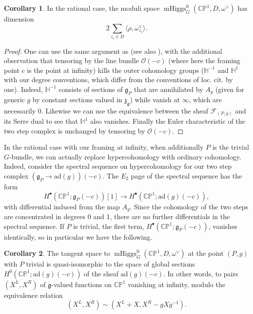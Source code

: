\documentclass[11pt, oneside, reqno]{amsart}
\theoremstyle{definition} \newtheorem{definition}{Definition}[section]
\newtheorem{corollary}[definition]{Corollary}
\theoremstyle{definition} \newtheorem{remark}[definition]{Remark}
\theoremstyle{definition} \newtheorem{remarks}[definition]{Remarks}
\theoremstyle{definition} \newtheorem{question}[definition]{Question}
\theoremstyle{definition} \newtheorem*{note}{Note}
\theoremstyle{definition} \newtheorem{example}[definition]{Example}
\theoremstyle{definition} \newtheorem{examples}[definition]{Examples}
\renewcommand{\gg}{\mathfrak{g}}
\newcommand{\bb}[1]{\mathbb{#1}}
\newcommand{\mr}[1]{\mathrm{#1}}
\newcommand{\mc}[1]{\mathcal{#1}}
\newcommand{\mf}[1]{\mathfrak{#1}}
\newcommand{\OO}{\mathcal{O}}
\DeclareMathOperator{\mhiggs}{mHiggs}
\newcommand{\fr}{\mathrm{fr}}
\newcommand{\ad}{\mr{ad}}
\begin{document}
\begin{corollary} \label{dim_of_moduli_space_cor}
In the rational case, the moduli space $\mhiggs^\fr_G(\bb{CP}^1, D, \omega^\vee)$ has dimension 
\[2 \sum_{z_i \in D} \langle \rho, \omega^\vee_{z_i} \rangle.\]
\end{corollary}

\begin{proof}
One can use the same argument as \cite{HurtubiseMarkman} (see also \cite[Proposition 5.6]{CharbonneauHurtubise}), with the additional observation that tensoring by the line bundle $\OO(-c)$ (where here the framing point $c$ is the point at infinity) kills the outer cohomology groups ($\bb H^{-1}$ and $\bb H^1$ with our degree conventions, which differ from the conventions of loc. cit. by one).  Indeed, $\bb H^{-1}$ consists of sections of $\gg_P$ that are annihilated by $A_g$ (given for generic $g$ by constant sections valued in $\mf z_{\gg}$) while vanish at $\infty$, which are necessarily 0.  Likewise we can use the equivalence between the sheaf $\mc F_{(P,g)}$ and its Serre dual to see that $\bb H^1$ also vanishes.  Finally the Euler characteristic of the two step complex is unchanged by tensoring by $\OO(-c)$. 
\end{proof}

In the rational case with our framing at infinity, when additionally $P$ is the trivial $G$-bundle, we can actually replace hypercohomology with ordinary cohomology.  Indeed, consider the spectral sequence on hypercohomology for our two step complex $(\gg_P \to \ad(g))(-c)$.  The $E_2$ page of the spectral sequence has the form
\[H^\bullet(\bb{CP}^1; \gg_P(-c))[1] \to H^\bullet(\bb{CP}^1; \ad(g)(-c)),\]
with differential induced from the map $A_g$.  Since the cohomology of the two steps are concentrated in degrees 0 and 1, there are no further differentials in the spectral sequence.  If $P$ is trivial, the first term, $H^\bullet(\bb{CP}^1; \gg_P(-c))$, vanishes identically, so in particular we have the following.

\begin{corollary}
The tangent space to $\mhiggs^\fr_G(\bb{CP}^1, D, \omega^\vee)$ at the point $(P,g)$ with $P$ trivial is quasi-isomorphic to the space of global sections $H^0(\bb{CP}^1; \ad(g)(-c))$ of the sheaf $\ad(g)(-c)$.  In other words, to pairs $(X^L, X^R)$ of $\gg$-valued functions on $\bb{CP}^1$ vanishing at infinity, modulo the equivalence relation
\begin{equation}\label{eq:equivalence} 
(X^L, X^R) \sim (X^L + X, X^R - gXg^{-1}).
\end{equation}
\end{corollary}
\end{document}

